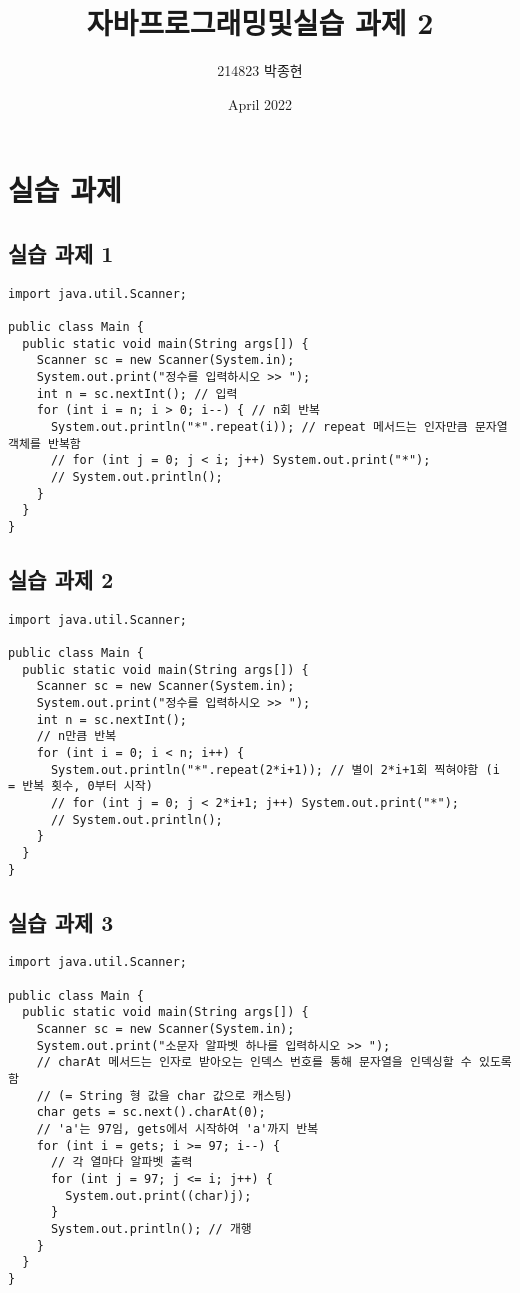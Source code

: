 \documentclass{article}
\title{자바프로그래밍및실습 과제 2}
\author{214823 박종현}
\date{April 2022}
\begin{document}
\maketitle

\pagebreak

\section{실습 과제}
\subsection{실습 과제 1}
\begin{lstlisting}
import java.util.Scanner;

public class Main {
  public static void main(String args[]) {
    Scanner sc = new Scanner(System.in);
    System.out.print("정수를 입력하시오 >> ");
    int n = sc.nextInt(); // 입력
    for (int i = n; i > 0; i--) { // n회 반복
      System.out.println("*".repeat(i)); // repeat 메서드는 인자만큼 문자열 객체를 반복함
      // for (int j = 0; j < i; j++) System.out.print("*");
      // System.out.println();
    }
  }
}
\end{lstlisting}
\subsection{실습 과제 2}
\begin{lstlisting}
import java.util.Scanner;

public class Main {
  public static void main(String args[]) {
    Scanner sc = new Scanner(System.in);
    System.out.print("정수를 입력하시오 >> ");
    int n = sc.nextInt();
    // n만큼 반복
    for (int i = 0; i < n; i++) {
      System.out.println("*".repeat(2*i+1)); // 별이 2*i+1회 찍혀야함 (i = 반복 횟수, 0부터 시작)
      // for (int j = 0; j < 2*i+1; j++) System.out.print("*");
      // System.out.println();
    }
  }
}
\end{lstlisting}
\subsection{실습 과제 3}
\begin{lstlisting}
import java.util.Scanner;

public class Main {
  public static void main(String args[]) {
    Scanner sc = new Scanner(System.in);
    System.out.print("소문자 알파벳 하나를 입력하시오 >> ");
    // charAt 메서드는 인자로 받아오는 인덱스 번호를 통해 문자열을 인덱싱할 수 있도록 함
    // (= String 형 값을 char 값으로 캐스팅)
    char gets = sc.next().charAt(0);
    // 'a'는 97임, gets에서 시작하여 'a'까지 반복
    for (int i = gets; i >= 97; i--) { 
      // 각 열마다 알파벳 출력
      for (int j = 97; j <= i; j++) {
        System.out.print((char)j);
      }
      System.out.println(); // 개행
    }
  }
}
\end{lstlisting}
\end{document}
